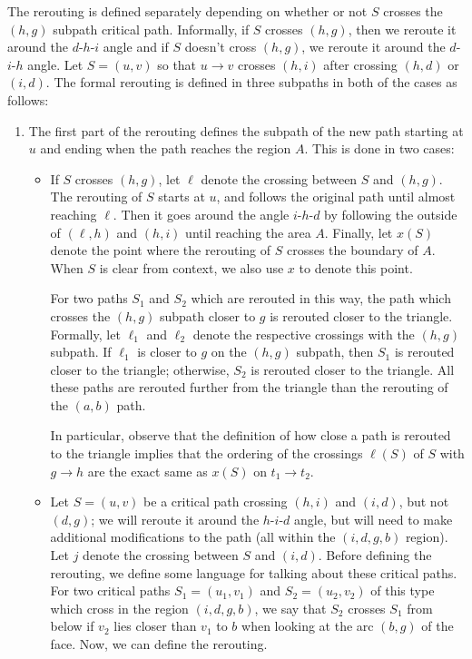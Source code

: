 \documentclass[11pt]{article}
\begin{document}
The rerouting is defined separately depending on whether or not $S$ crosses the $(h,g)$ subpath critical path. Informally, if $S$ crosses $(h,g)$, then we reroute it around the $d$-$h$-$i$ angle and if $S$ doesn't cross $(h,g)$, we reroute it around the $d$-$i$-$h$ angle. Let $S=(u,v)$ so that $u\to v$ crosses $(h,i)$ after crossing $(h,d)$ or $(i,d)$. The formal rerouting is defined in three subpaths in both of the cases as follows:
\begin{enumerate}[label=\roman*.]
    \item The first part of the rerouting defines the subpath of the new path starting at $u$ and ending when the path reaches the region $A$. This is done in two cases:
    \begin{itemize}
        \item[R1.] If $S$ crosses $(h,g)$, let $\ell$ denote the crossing between $S$ and $(h,g)$. The rerouting of $S$ starts at $u$, and follows the original path until almost reaching $\ell$. Then it goes around the angle $i$-$h$-$d$ by following the outside of $(\ell,h)$ and $(h,i)$ until reaching the area $A$. Finally, let $x(S)$ denote the point where the rerouting of $S$ crosses the boundary of $A$. When $S$ is clear from context, we also use $x$ to denote this point.

        For two paths $S_1$ and $S_2$ which are rerouted in this way, the path which crosses the $(h,g)$ subpath closer to $g$ is rerouted closer to the triangle. Formally, let $\ell_1$ and $\ell_2$ denote the respective crossings with the $(h,g)$ subpath. If $\ell_1$ is closer to $g$ on the $(h,g)$ subpath, then $S_1$ is rerouted closer to the triangle; otherwise, $S_2$ is rerouted closer to the triangle. All these paths are rerouted further from the triangle than the rerouting of the $(a,b)$ path.

        In particular, observe that the definition of how close a path is rerouted to the triangle implies that the ordering of the crossings $\ell(S)$ of $S$ with $g\to h$ are the exact same as $x(S)$ on $t_1\to t_2$.
        \item[R2.] Let $S=(u,v)$ be a critical path crossing $(h,i)$ and $(i,d)$, but not $(d,g)$; we will reroute it around the $h$-$i$-$d$ angle, but will need to make additional modifications to the path (all within the $(i,d,g,b)$ region). Let $j$ denote the crossing between $S$ and $(i,d)$. Before defining the rerouting, we define some language for talking about these critical paths. For two critical paths $S_1=(u_1,v_1)$ and $S_2=(u_2,v_2)$ of this type which cross in the region $(i,d,g,b)$, we say that $S_2$ crosses $S_1$ from below if $v_2$ lies closer than $v_1$ to $b$ when looking at the arc $(b,g)$ of the face. Now, we can define the rerouting.
    

\end{itemize}
\end{enumerate}
\end{document}
